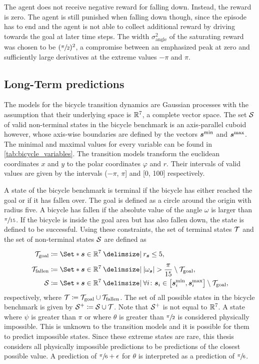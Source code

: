 The agent does not receive negative reward for falling down.
Instead, the reward is zero.
The agent is still punished when falling down though, since the episode has to end and the agent is not able to collect additional reward by driving towards the goal at later time steps.
The width $\sigma_{\text{angle}}^2$ of the saturating reward was chosen to be $(\sfrac{\pi}{2})^2$, a compromise between an emphasized peak at zero and sufficiently large derivatives at the extreme values $-\pi$ and $\pi$.

\subsection{Long-Term predictions}
\label{sub:map_predictions}
The models for the bicycle transition dynamics are Gaussian processes with the assumption that their underlying space is $\mathbb{R}^7$, a complete vector space.
The set $\mathcal{S}$ of valid non-terminal states in the bicycle benchmark is an axis-parallel cuboid however, whose axis-wise boundaries are defined by the vectors $\bm{s}^{\text{min}}$ and $\bm{s}^{\text{max}}$.
The minimal and maximal values for every variable can be found in \cref{tab:bicycle_variables}.
The transition models transform the euclidean coordinates $x$ and $y$ to the polar coordinates $\varphi$ and $r$.
Their intervals of valid values are given by the intervals ($-\pi$, $\pi$] and [0, 100] respectively.

A state of the bicycle benchmark is terminal if the bicycle has either reached the goal or if it has fallen over.
The goal is defined as a circle around the origin with radius five.
A bicycle has fallen if the absolute value of the angle $\omega$ is larger than $\sfrac{\pi}{15}$.
If the bicycle is inside the goal area but has also fallen down, the state is defined to be successful.
Using these constraints, the set of terminal states $\mathcal{T}$ and the set of non-terminal states $\mathcal{S}$ are defined as
\begin{align}
    \Goal &\coloneqq \Set*{\mat{s} \in \R^7 \with r_{\mat{s}} \leq 5 \vphantom{\frac{\pi}{15}}}, \\
    \Fallen &\coloneqq \Set*{\mat{s} \in \R^7 \with \abs{\omega_{\mat{s}}} > \frac{\pi}{15}} \setminus \Goal, \\
    \Es &\coloneqq \Set*{\mat{s} \in \R^7 \with \forall i \colon \mat{s}_i \in \left[ \mat{s}_i^{\text{min}}, \mat{s}_i^{\text{max}} \right]} \setminus \Goal,
\end{align}
respectively, where $\mathcal{T} \coloneqq \mathcal{T}_{\text{goal}} \cup \mathcal{T}_{\text{fallen}}$.
The set of all possible states in the bicycle benchmark is given by $\mathcal{S}^+ \coloneqq \mathcal{S} \cup \mathcal{T}$.
Note that $\mathcal{S}^+$ is not equal to $\mathbb{R}^7$.
A state where $\psi$ is greater than $\pi$ or where $\theta$ is greater than $\sfrac{\pi}{2}$ is considered physically impossible.
This is unknown to the transition models and it is possible for them to predict impossible states.
Since these extreme states are rare, this thesis considers all physically impossible predictions to be predictions of the closest possible value.
A prediction of $\sfrac{\pi}{6} + \epsilon$ for $\theta$ is interpreted as a prediction of $\sfrac{\pi}{6}$.

